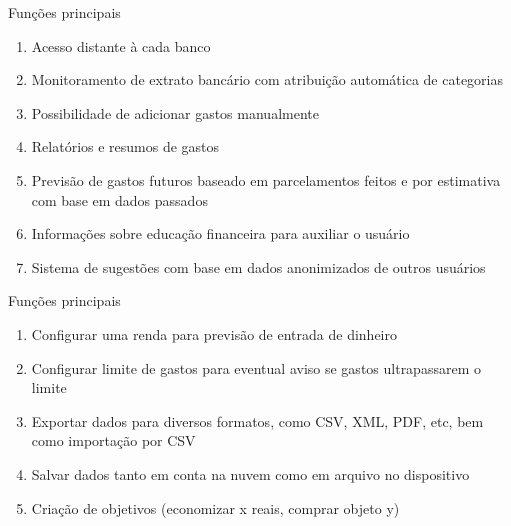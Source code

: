 \documentclass[12pt]{beamer}
\begin{document}
\begin{frame}{Funções principais}
    \begin{enumerate}[label=•]
        \item Acesso distante à cada banco
        \item Monitoramento de extrato bancário com atribuição automática de categorias
        \item Possibilidade de adicionar gastos manualmente
        \item Relatórios e resumos de gastos
        \item Previsão de gastos futuros baseado em parcelamentos feitos e por estimativa com base em dados passados
        \item Informações sobre educação financeira para auxiliar o usuário 
        \item Sistema de sugestões com base em dados anonimizados de outros usuários
    \end{enumerate}
\end{frame}

\begin{frame}{Funções principais}
    \begin{enumerate}[label=•]
        \item Configurar uma renda para previsão de entrada de dinheiro
        \item Configurar limite de gastos para eventual aviso se gastos ultrapassarem o limite
        \item Exportar dados para diversos formatos, como CSV, XML, PDF, etc, bem como importação por CSV
        \item Salvar dados tanto em conta na nuvem como em arquivo no dispositivo
        \item Criação de objetivos (economizar x reais, comprar objeto y)
    \end{enumerate}
\end{frame}
\end{document}

